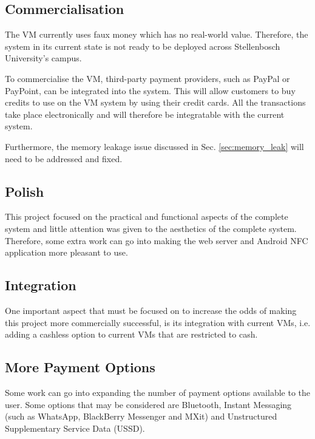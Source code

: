 \subsection{Commercialisation}

The VM currently uses faux money which has no real-world value. Therefore,
the system in its current state is not ready to be deployed across Stellenbosch
University's campus. 

To commercialise the VM, third-party payment providers, such
as PayPal or PayPoint, can be integrated into the system. This will allow customers to
buy credits to use on the VM system by using their credit cards. All the
transactions take place electronically and will therefore be integratable with
the current system.

Furthermore, the memory leakage issue discussed in Sec. \ref{sec:memory_leak} will need
to be addressed and fixed.

\subsection{Polish}

This project focused on the practical and functional aspects of the complete system and
little attention was given to the aesthetics of the complete system.
Therefore, some extra work can go into making the web server and Android NFC application more pleasant to use. 

\subsection{Integration}

One important aspect that must be focused on to increase the odds of making this project
more commercially successful, is its integration with current VMs, i.e.
adding a cashless option to current VMs that are restricted to cash.

\subsection{More Payment Options}

Some work can go into expanding the number of payment options available to the user.
Some options that may be considered are Bluetooth, Instant Messaging (such as WhatsApp,
BlackBerry Messenger and MXit) and Unstructured Supplementary Service Data (USSD).